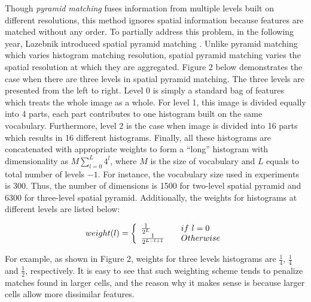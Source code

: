 \noindent Though {\em pyramid matching} fuses information from multiple levels built on different resolutions, this method ignores spatial information because features are matched without any order. To partially address this problem, in the following year, Lazebnik introduced spatial pyramid matching \cite{lazebnik2006beyond}. Unlike pyramid matching which varies histogram matching resolution, spatial pyramid matching varies the spatial resolution at which they are aggregated. Figure 2 below demonstrates the case when there are three levels in spatial pyramid matching. The three levels are presented from the left to right. Level 0 is simply a standard bag of features which treats the whole image as a whole. For level 1, this image is divided equally into 4 parts, each part contributes to one histogram built on the same vocabulary. Furthermore, level 2 is the case when image is divided into 16 parts which results in 16 different histograms. Finally, all these histograms are concatenated with appropriate weights to form a ``long'' histogram with dimensionality as $M\sum_{l=0}^{L}4^{l}$, where $M$ is the size of vocabulary and $L$ equals to total number of levels $ - 1$. For instance, the vocabulary size used in experiments is 300. Thus, the number of dimensions is 1500 for two-level spatial pyramid and 6300 for three-level spatial pyramid. Additionally, the weights for histograms at different levels are listed below:

\begin{equation}
 weight(l) = \left\{ 
\begin{array}{l l}
  \frac{1}{2^L} & \quad \text{$if \ l = 0$ }\\
  \frac{1}{2^{L-l+1}} & \quad \text{$Otherwise$}
\end{array} \right.
\end{equation}

\noindent For example, as shown in Figure 2, weights for three levels histograms are $\frac{1}{4}$, $\frac{1}{4}$ and $\frac{1}{2}$, respectively. It is easy to see that such weighting scheme tends to penalize matches found in larger cells, and the reason why it makes sense is because larger cells allow more dissimilar features. 

